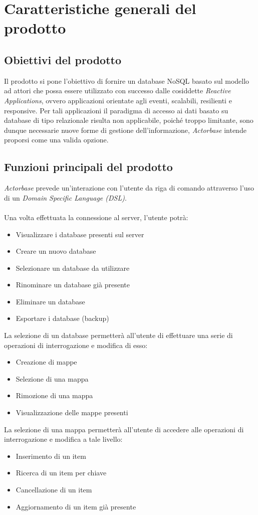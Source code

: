 \documentclass[a4paper]{article}
\begin{document}
		
	\newpage 
	\section{Caratteristiche generali del prodotto}
	\subsection{Obiettivi del prodotto}
		Il prodotto si pone l'obiettivo di fornire un database NoSQL basato sul modello ad attori che possa 
		essere utilizzato con successo dalle cosiddette \emph{Reactive Applications}, ovvero applicazioni
		orientate agli eventi, scalabili, resilienti e responsive. Per tali applicazioni il paradigma di accesso 
		ai dati basato su database di tipo relazionale risulta non applicabile, poiché troppo limitante, sono 
		dunque necessarie nuove forme di gestione dell'informazione, \emph{Actorbase} intende proporsi 
		come una valida opzione.
	\subsection{Funzioni principali del prodotto}
		\emph{Actorbase} prevede un'interazione con l'utente da riga di comando attraverso l'uso di un 
		\emph{Domain Specific Language (DSL)}. 
		\\ \\
		Una volta effettuata la connessione al server, l'utente potrà:
		\begin{itemize}
			\item Visualizzare i database presenti sul server
			\item Creare un nuovo database
			\item Selezionare un database da utilizzare
			\item Rinominare un database già presente
			\item Eliminare un database
			\item Esportare i database (backup)
		\end{itemize}
		La selezione di un database permetterà all'utente di effettuare una serie di operazioni di interrogazione e modifica di esso:
		\begin{itemize}
			\item Creazione di mappe
			\item Selezione di una mappa
			\item Rimozione di una mappa
			\item Visualizzazione delle mappe presenti
		\end{itemize}
		La selezione di una mappa permetterà all'utente di accedere alle operazioni di interrogazione e modifica a tale livello:
		\begin{itemize}
			\item Inserimento di un item
			\item Ricerca di un item per chiave
			\item Cancellazione di un item
			\item Aggiornamento di un item già presente
		\end{itemize}
\end{document}
